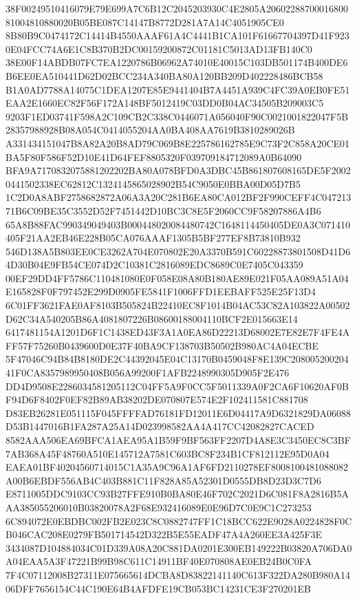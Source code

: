 \documentclass[UTF8,fontset=fandol,zihao=-4,a4paper]{ctexart}
\begin{document}
{{38F00249510416079E79E699A7C6B12C2045203930C4E2805A2060228870001680081004810880020B05BE087C14147B8772D281A7A14C4051905CE0
8B80B9C0474172C14414B4550AAAF61A4C4441B1CA101F61667704397D41F9230E04FCC74A6E1C8B370B2DC00159200872C01181C5013AD13FB140C0
38E00F14ABDB07FC7EA1220786B06962A74010E40015C103DB501174B400DE6B6EE0EA510441D62D02BCC234A340BA80A120BB209D402228486BCB58
B1A0AD7788A14075C1DEA1207E85E9441404B7A4451A939C4FC39A0EB0FE51EAA2E1660EC82F56F172A148BF5012419C03DD0B04AC34505B209003C5
9203F1ED03741F598A2C109CB2C338C0446071A056040F90C0021001822047F5B28357988928B08A054C0414055204AA0BA408AA7619B3810289026B
A331434151047B8A82A20B8AD79C069B8E225786162785E9C73F2C858A20CE01BA5F80F586F52D10E41D64FEF8805320F039709184712089A0B64090
BFA9A7170832075881202202BA80A078BFD0A3DBC45B861807608165DE5F20020441502338EC62812C1324145865028902B54C9050E0BBA00D05D7B5
1C2D0A8ABF2758682872A06A3A20C281B6EA80CA012BF2F990CEFF4C04721371B6C09BE35C3552D52F7451442D10BC3C8E5F2060CC9F58207886A4B6
65A8B88FAC990349049403B000448020084480742C1648114450405DE0A3C071410405F21AA2EB46E228B05CA076AAAF1305B5BF277EF8B73810B932
546D138A5B803EE0CE3262A704E070802E20A3370B591C60228873801508D41D64D30B04E9FB54CE074D2C10381C2816089EDC8689C0E7405C043359
00EF29DD4FF5786C110481080E0F058E08A80B180AE89E021F05AA089A51A04E165828F0F797452E299D0905FE5841F1006FFD1EEBAFF525E25F13D4
6C01FF3621FAE0AF8103B505824B22410EC8F1014B04AC53C82A103822A00502D62C34A540205B86A4081807226B08600188004110BCF2E015663E14
6417481154A1201D6F1C1438ED43F3A1A0EA86D22213D68002E7E82E7F4FE4AFF57F75260B0439600D0E37F40BA9CF138703B50502B980AC4A04ECBE
5F47046C94B84B8180DE2C44392045E04C13170B0459048F8E139C20800520020441F0CA8357989950408B056A99200F1AFB2248990305D905F2E476
DD4D9508E2286034581205112C04FF5A9F0CC5F5011339A0F2CA6F10620AF0BF94D6F8402F0EF82B89AB38202DE070807E574E2F102411581C881708
D83EB26281E051115F045FFFFAD76181FD12011E6D04417A9D6321829DA06088D53B1447016B1FA287A25A14D023998582AA4A417CC42082827CACED
8582AAA506EA69BFCA1AEA95A1B59F9BF563FF2207D4A8E3C3450EC8C3BF7AB368A45F48760A510E145712A7581C603BC8F234B1CF812112E95D0A04
EAEA01BF40204560714015C1A35A9C96A1AF6FD2110278EF8008100481088082A00B6EBDF556AB4C403B881C11F828A85A52301D0555DB8D23D3C7D6
E8711005DDC9103CC93B27FFE910B0BA80E46F702C2021D6C081F8A2816B5AAA385055206010B03820078A2F68E932416089E0E96D7C0E9C1C273253
6C894072E0EBDBC002FB2E023C8C0882747FF1C18BCC622E9028A0224828F0CB046CAC208E0279FB501714542D322B5E55EADF47A4A260EE3A425F3E
3434087D104884034C01D339A08A20C881DA0201E300EB149222B03820A706DA0A04EAA5A3F47221B99B98C611C14911BF40E070808AE0EB24B0C0FA
7F4C07112008B27311E075665614DCBA8D83822141140C613F322DA280B980A1406DFF7656154C44C190E64B4AFDFE19CB053BC14231CE3F270201EB
}}
\end{document}
